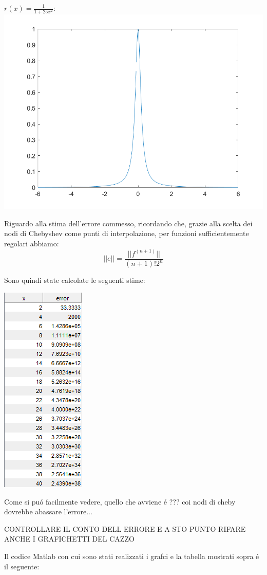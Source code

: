 \begin{center}
\scriptsize{\(r(x) = \frac{1}{1+25x^2}\):}\\
\includegraphics[scale=0.45]{cap4/4_7/runge.png}
\end{center}


\noindent Riguardo alla stima dell'errore commesso, ricordando che, grazie alla scelta dei nodi di Chebyshev come punti di interpolazione, per funzioni sufficientemente regolari abbiamo:
\[
||e|| = \frac{||f^{(n+1)}||}{(n+1)!2^n}
\]

\noindent Sono quindi state calcolate le seguenti stime:

\begin{center}
	\includegraphics[scale=0.5]{cap4/4_7/4_7_error.png}
\end{center}

\noindent Come si pu\'o facilmente vedere, quello che avviene \'e ??? coi nodi di cheby dovrebbe abassare l'errore...

CONTROLLARE IL CONTO DELL ERRORE E A STO PUNTO RIFARE ANCHE I GRAFICHETTI DEL CAZZO

\noindent Il codice Matlab con cui sono stati realizzati i grafci e la tabella mostrati sopra \'e il seguente:


